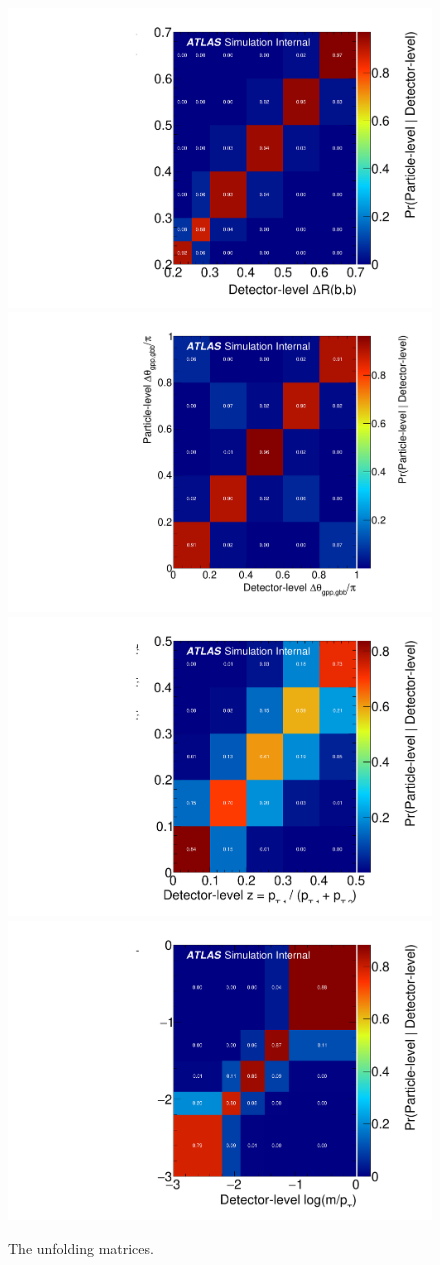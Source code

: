 \begin{figure}[htpb!]
\begin{center}
  \includegraphics[width=0.45\linewidth]{figures/gbb/Unfolding/dR_ResponseMatrix_x.pdf}
  \includegraphics[width=0.45\linewidth]{figures/gbb/Unfolding/dphi_ResponseMatrix_x.pdf}\\
  \includegraphics[width=0.45\linewidth]{figures/gbb/Unfolding/ZpT_ResponseMatrix_x.pdf}
  \includegraphics[width=0.45\linewidth]{figures/gbb/Unfolding/fracmasspt_ResponseMatrix_x.pdf}
\caption[]{The unfolding matrices.  } 
\label{fig:gbb-responsematrix1}
\end{center}
\end{figure}

